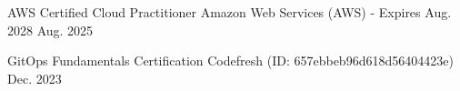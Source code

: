 

\begin{cvhonors}

\cvhonor
  {AWS Certified Cloud Practitioner} %
  {Amazon Web Services (AWS) - Expires Aug. 2028} %
  {} %
  {Aug. 2025} %

\cvhonor
  {GitOps Fundamentals Certification} %
  {Codefresh (ID: 657ebbeb96d618d56404423e)} %
  {} %
  {Dec. 2023} %

\end{cvhonors}